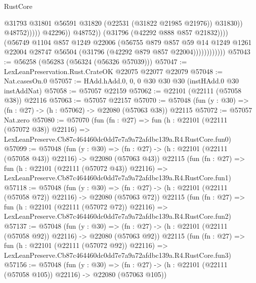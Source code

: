 \begin{lexlean}{RustCore}
\begin{coremodule}
                                              @31793
                                              @31801
                                              @56591
                                              @31820
                                              (@22531 (@31822 @21985 @21976))
                                              @31830))
                                          @48752)))))
                                @42296))
                            @48752))
                        (@31796 (@42292 @888 @857 @21832))))
                    (@56749
                      @1104
                      @857
                      @1249
                      @22006
                      (@56755
                        @879
                        @857
                        @59
                        @14
                        @1249
                        @1261
                        @22004
                        @28747
                        @56504
                        (@31796 (@42292 @879 @857 @22004))))))))))))
@57043 := @56258 (@56283 (@56324 (@56326 @57039)))
@57047 := LexLeanPreservation.Rust.CrateOK @22075 @22077 @22079
@57048 := Nat.casesOn.{0}
@57057 := HAdd.hAdd.{0, 0, 0} @30 @30 @30 (instHAdd.{0} @30 instAddNat)
@57058 := @57057 @22159
@57062 := @22101 (@22111 (@57058 @38)) @22116
@57063 := @57057 @22157
@57070 := @57048 (fun (y : @30) => (fn : @27) -> (h : @57062) -> @22080 (@57063 @38)) @22115
@57072 := @57057 Nat.zero
@57080 := @57070
    (fun (fn : @27) =>
    fun (h : @22101 (@22111 (@57072 @38)) @22116) =>
    LexLeanPreserve.Cb87c464460dc0dd7e7a9a72afdbc139a.R4.RustCore.fun0)
@57099 := @57048
    (fun (y : @30) =>
    (fn : @27) -> (h : @22101 (@22111 (@57058 @43)) @22116) -> @22080 (@57063 @43))
    @22115
    (fun (fn : @27) =>
    fun (h : @22101 (@22111 (@57072 @43)) @22116) =>
    LexLeanPreserve.Cb87c464460dc0dd7e7a9a72afdbc139a.R4.RustCore.fun1)
@57118 := @57048
    (fun (y : @30) =>
    (fn : @27) -> (h : @22101 (@22111 (@57058 @72)) @22116) -> @22080 (@57063 @72))
    @22115
    (fun (fn : @27) =>
    fun (h : @22101 (@22111 (@57072 @72)) @22116) =>
    LexLeanPreserve.Cb87c464460dc0dd7e7a9a72afdbc139a.R4.RustCore.fun2)
@57137 := @57048
    (fun (y : @30) =>
    (fn : @27) -> (h : @22101 (@22111 (@57058 @92)) @22116) -> @22080 (@57063 @92))
    @22115
    (fun (fn : @27) =>
    fun (h : @22101 (@22111 (@57072 @92)) @22116) =>
    LexLeanPreserve.Cb87c464460dc0dd7e7a9a72afdbc139a.R4.RustCore.fun3)
@57156 := @57048
    (fun (y : @30) =>
    (fn : @27) -> (h : @22101 (@22111 (@57058 @105)) @22116) -> @22080 (@57063 @105))

\end{coremodule}
\end{lexlean}
